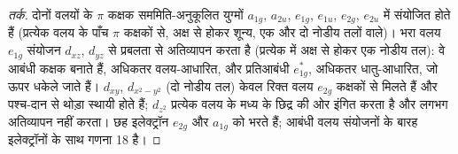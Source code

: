 \begin{proof}[तर्क]
दोनों वलयों के $\pi$ कक्षक सममिति-अनुकूलित युग्मों $a_{1g}$, $a_{2u}$,
$e_{1g}$, $e_{1u}$, $e_{2g}$, $e_{2u}$ में संयोजित होते हैं (प्रत्येक वलय के पाँच $\pi$ कक्षकों से, अक्ष से होकर शून्य, एक और दो
नोडीय तलों वाले)। भरा वलय $e_{1g}$ संयोजन $d_{xz}$, $d_{yz}$ से प्रबलता से अतिव्यापन करता है
(प्रत्येक में अक्ष से होकर एक नोडीय तल): वे आबंधी
कक्षक बनाते हैं, अधिकतर वलय-आधारित, और प्रतिआबंधी $e_{1g}^\ast$, अधिकतर धातु-आधारित, जो ऊपर धकेले जाते हैं। $d_{xy}$, $d_{x^2-y^2}$
(दो नोडीय तल) केवल रिक्त वलय $e_{2g}$ कक्षकों से मिलते हैं और पश्च-दान से थोड़ा
स्थायी होते हैं; $d_{z^2}$ प्रत्येक वलय के मध्य के छिद्र की ओर इंगित करता है और
लगभग अतिव्यापन नहीं करता। छह इलेक्ट्रॉन $e_{2g}$ और $a_{1g}$ को भरते हैं; आबंधी वलय संयोजनों के
बारह इलेक्ट्रॉनों के साथ गणना 18 है।
\end{proof}

